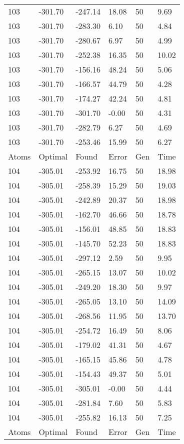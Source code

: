 \documentclass{report}
\begin{document}
\begin{appendix}
\begin{longtable}{llllll}
103 & -301.70 & -247.14 & 18.08 & 50 & 9.69 \\
103 & -301.70 & -283.30 & 6.10 & 50 & 4.84 \\
103 & -301.70 & -280.67 & 6.97 & 50 & 4.99 \\
103 & -301.70 & -252.38 & 16.35 & 50 & 10.02 \\
103 & -301.70 & -156.16 & 48.24 & 50 & 5.06 \\
103 & -301.70 & -166.57 & 44.79 & 50 & 4.28 \\
103 & -301.70 & -174.27 & 42.24 & 50 & 4.81 \\
103 & -301.70 & -301.70 & -0.00 & 50 & 4.31 \\
103 & -301.70 & -282.79 & 6.27 & 50 & 4.69 \\
103 & -301.70 & -253.46 & 15.99 & 50 & 6.27 \\
Atoms & Optimal & Found & Error & Gen & Time \\
104 & -305.01 & -253.92 & 16.75 & 50 & 18.98 \\
104 & -305.01 & -258.39 & 15.29 & 50 & 19.03 \\
104 & -305.01 & -242.89 & 20.37 & 50 & 18.98 \\
104 & -305.01 & -162.70 & 46.66 & 50 & 18.78 \\
104 & -305.01 & -156.01 & 48.85 & 50 & 18.83 \\
104 & -305.01 & -145.70 & 52.23 & 50 & 18.83 \\
104 & -305.01 & -297.12 & 2.59 & 50 & 9.95 \\
104 & -305.01 & -265.15 & 13.07 & 50 & 10.02 \\
104 & -305.01 & -249.20 & 18.30 & 50 & 9.97 \\
104 & -305.01 & -265.05 & 13.10 & 50 & 14.09 \\
104 & -305.01 & -268.56 & 11.95 & 50 & 13.70 \\
104 & -305.01 & -254.72 & 16.49 & 50 & 8.06 \\
104 & -305.01 & -179.02 & 41.31 & 50 & 4.67 \\
104 & -305.01 & -165.15 & 45.86 & 50 & 4.78 \\
104 & -305.01 & -154.43 & 49.37 & 50 & 5.01 \\
104 & -305.01 & -305.01 & -0.00 & 50 & 4.44 \\
104 & -305.01 & -281.84 & 7.60 & 50 & 5.83 \\
104 & -305.01 & -255.82 & 16.13 & 50 & 7.25 \\
Atoms & Optimal & Found & Error & Gen & Time \\

\end{longtable}
\end{appendix}
\end{document}
